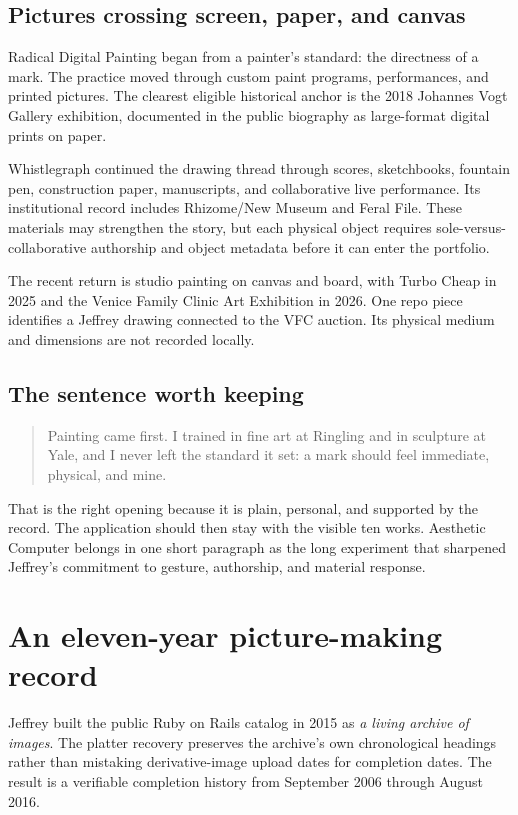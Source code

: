 \documentclass[11pt,letterpaper]{article}
\begin{document}
\subsection{Pictures crossing screen, paper, and canvas}

Radical Digital Painting began from a painter's standard: the directness of a mark. The practice moved through custom paint programs, performances, and printed pictures. The clearest eligible historical anchor is the 2018 Johannes Vogt Gallery exhibition, documented in the public biography as large-format digital prints on paper.

Whistlegraph continued the drawing thread through scores, sketchbooks, fountain pen, construction paper, manuscripts, and collaborative live performance. Its institutional record includes Rhizome/New Museum and Feral File. These materials may strengthen the story, but each physical object requires sole-versus-collaborative authorship and object metadata before it can enter the portfolio.

The recent return is studio painting on canvas and board, with Turbo Cheap in 2025 and the Venice Family Clinic Art Exhibition in 2026. One repo piece identifies a Jeffrey drawing connected to the VFC auction. Its physical medium and dimensions are not recorded locally.

\subsection{The sentence worth keeping}

\begin{quote}
Painting came first. I trained in fine art at Ringling and in sculpture at Yale, and I never left the standard it set: a mark should feel immediate, physical, and mine.
\end{quote}

That is the right opening because it is plain, personal, and supported by the record. The application should then stay with the visible ten works. Aesthetic Computer belongs in one short paragraph as the long experiment that sharpened Jeffrey's commitment to gesture, authorship, and material response.

\clearpage
\section{An eleven-year picture-making record}

Jeffrey built the public Ruby on Rails catalog in 2015 as \emph{a living archive of images}. The platter recovery preserves the archive's own chronological headings rather than mistaking derivative-image upload dates for completion dates. The result is a verifiable completion history from September 2006 through August 2016.
\end{document}
